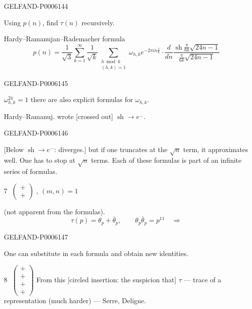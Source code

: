 \begin{GelfandAdjacentEvidence}{GELFAND-P000614}{4}

Using \(p(n)\), find \(\tau(n)\) recursively.

Hardy–Ramanujan–Rademacher formula
\[
p(n)=\frac1{\sqrt3}\sum_{k=1}^{\infty}\frac1{\sqrt k}
\sum_{\substack{h\bmod k\\(h,k)=1}}
\omega_{h,k}e^{-2\pi i n\frac1k}\cdot
\frac d{dn}\frac{\operatorname{sh}\frac\pi{6k}\sqrt{24n-1}}
{\frac\pi{6k}\sqrt{24n-1}}
\]
\end{GelfandAdjacentEvidence}
\begin{GelfandAdjacentEvidence}{GELFAND-P000614}{5}

\(\omega_{h,k}^{24}=1\) there are also explicit formulas for \(\omega_{h,k}\).

Hardy–Ramanuj. wrote [crossed out] \(\operatorname{sh}\to e^{\ldots}\).
\end{GelfandAdjacentEvidence}
\begin{GelfandAdjacentEvidence}{GELFAND-P000614}{6}

[Below \(\operatorname{sh}\to e^{\ldots}\): diverges.]
but if one truncates at the \(\sqrt n\) term, it approximates well.
One has to stop at \(\sqrt n\) terms.
Each of these formulas is part of an infinite series of formulas.

\textcircled{\scriptsize 7}\quad
\(\left(\begin{smallmatrix}+\\+\end{smallmatrix}\right)\)
\qquad {}, \((m,n)=1\)

(not apparent from the formulas).
\[
\tau(p)=\theta_p+\bar\theta_p,\qquad\theta_p\bar\theta_p=p^{11}
\quad\Rightarrow
\]
\begin{center}
\end{center}
\end{GelfandAdjacentEvidence}
\begin{GelfandAdjacentEvidence}{GELFAND-P000614}{7}

One can substitute in each formula and obtain new identities.

\textcircled{\scriptsize 8}\quad
\(\left(\begin{smallmatrix}+\\+\\+\\+\end{smallmatrix}\right)\)
\qquad From this [circled insertion: the suspicion that] \(\tau\) — trace of a representation (much harder) — Serre, Deligne.
\end{GelfandAdjacentEvidence}

